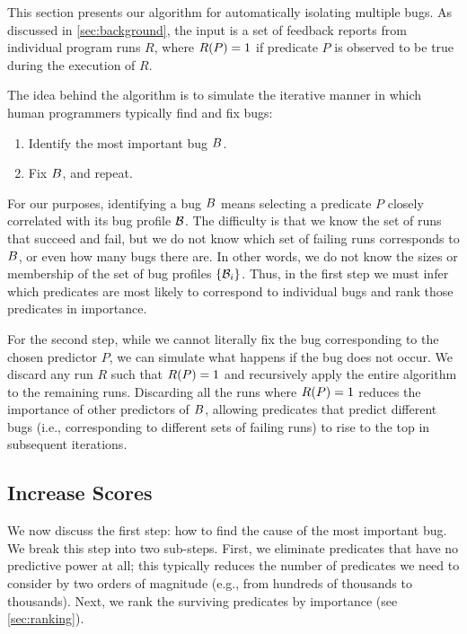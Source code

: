 This section presents our algorithm for automatically isolating
multiple bugs.  As discussed in \autoref{sec:background}, the input is
a set of feedback reports from individual program runs $R$, where
$R(P) = 1$ if predicate $P$ is observed to be true during the
execution of $R$.

The idea behind the algorithm is to simulate the iterative manner in which  human programmers
typically find and fix bugs:
\begin{enumerate}

\item Identify the most important bug $B$.

\item Fix $B$, and repeat.

\end{enumerate}

For our purposes, identifying a bug $B$ means selecting a
predicate $P$ closely correlated with its bug profile $\mathcal{B}$.  The difficulty is that we
know the set of runs that succeed and fail, but we do not know which
set of failing runs corresponds to $B$, or even how many bugs there
are.  In other words, we do not know the sizes or membership of the set
of bug profiles $\{\mathcal{B}_i\}$.
Thus, in the first step we must infer which predicates are most
likely to correspond to individual bugs and rank those predicates in
importance.

For the second step, while we cannot literally fix the bug
corresponding to the chosen predictor $P$, we can simulate what
happens if the bug does not occur.  We discard any run $R$ such that
$R(P) = 1$ and recursively apply the entire algorithm to the remaining runs.  Discarding all the runs where
$R(P) = 1$ reduces the importance of other predictors of
$B$, allowing predicates that predict different bugs (i.e.,
corresponding to different sets of failing runs) to rise to the top in
subsequent iterations.

\subsection{Increase Scores}
\label{sec:increase}

We now discuss the first step: how to find the cause of the most important bug.
We break this step into two sub-steps.  First, we eliminate predicates that have no
predictive power at all; this typically reduces the number of predicates we need
to consider by two orders of magnitude (e.g., from hundreds of thousands to thousands).
Next, we rank the surviving predicates by importance (see \autoref{sec:ranking}).

